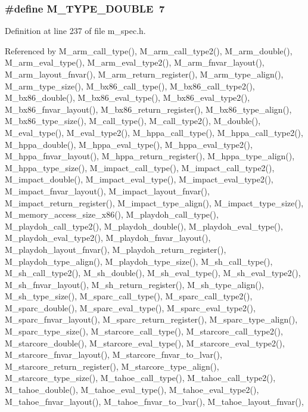 \subsubsection{\setlength{\rightskip}{0pt plus 5cm}\#define M\_\-TYPE\_\-DOUBLE~7}\label{m__spec_8h_48d49739b20483626fbb83ff298c8817}




Definition at line 237 of file m\_\-spec.h.

Referenced by M\_\-arm\_\-call\_\-type(), M\_\-arm\_\-call\_\-type2(), M\_\-arm\_\-double(), M\_\-arm\_\-eval\_\-type(), M\_\-arm\_\-eval\_\-type2(), M\_\-arm\_\-fnvar\_\-layout(), M\_\-arm\_\-layout\_\-fnvar(), M\_\-arm\_\-return\_\-register(), M\_\-arm\_\-type\_\-align(), M\_\-arm\_\-type\_\-size(), M\_\-bx86\_\-call\_\-type(), M\_\-bx86\_\-call\_\-type2(), M\_\-bx86\_\-double(), M\_\-bx86\_\-eval\_\-type(), M\_\-bx86\_\-eval\_\-type2(), M\_\-bx86\_\-fnvar\_\-layout(), M\_\-bx86\_\-return\_\-register(), M\_\-bx86\_\-type\_\-align(), M\_\-bx86\_\-type\_\-size(), M\_\-call\_\-type(), M\_\-call\_\-type2(), M\_\-double(), M\_\-eval\_\-type(), M\_\-eval\_\-type2(), M\_\-hppa\_\-call\_\-type(), M\_\-hppa\_\-call\_\-type2(), M\_\-hppa\_\-double(), M\_\-hppa\_\-eval\_\-type(), M\_\-hppa\_\-eval\_\-type2(), M\_\-hppa\_\-fnvar\_\-layout(), M\_\-hppa\_\-return\_\-register(), M\_\-hppa\_\-type\_\-align(), M\_\-hppa\_\-type\_\-size(), M\_\-impact\_\-call\_\-type(), M\_\-impact\_\-call\_\-type2(), M\_\-impact\_\-double(), M\_\-impact\_\-eval\_\-type(), M\_\-impact\_\-eval\_\-type2(), M\_\-impact\_\-fnvar\_\-layout(), M\_\-impact\_\-layout\_\-fnvar(), M\_\-impact\_\-return\_\-register(), M\_\-impact\_\-type\_\-align(), M\_\-impact\_\-type\_\-size(), M\_\-memory\_\-access\_\-size\_\-x86(), M\_\-playdoh\_\-call\_\-type(), M\_\-playdoh\_\-call\_\-type2(), M\_\-playdoh\_\-double(), M\_\-playdoh\_\-eval\_\-type(), M\_\-playdoh\_\-eval\_\-type2(), M\_\-playdoh\_\-fnvar\_\-layout(), M\_\-playdoh\_\-layout\_\-fnvar(), M\_\-playdoh\_\-return\_\-register(), M\_\-playdoh\_\-type\_\-align(), M\_\-playdoh\_\-type\_\-size(), M\_\-sh\_\-call\_\-type(), M\_\-sh\_\-call\_\-type2(), M\_\-sh\_\-double(), M\_\-sh\_\-eval\_\-type(), M\_\-sh\_\-eval\_\-type2(), M\_\-sh\_\-fnvar\_\-layout(), M\_\-sh\_\-return\_\-register(), M\_\-sh\_\-type\_\-align(), M\_\-sh\_\-type\_\-size(), M\_\-sparc\_\-call\_\-type(), M\_\-sparc\_\-call\_\-type2(), M\_\-sparc\_\-double(), M\_\-sparc\_\-eval\_\-type(), M\_\-sparc\_\-eval\_\-type2(), M\_\-sparc\_\-fnvar\_\-layout(), M\_\-sparc\_\-return\_\-register(), M\_\-sparc\_\-type\_\-align(), M\_\-sparc\_\-type\_\-size(), M\_\-starcore\_\-call\_\-type(), M\_\-starcore\_\-call\_\-type2(), M\_\-starcore\_\-double(), M\_\-starcore\_\-eval\_\-type(), M\_\-starcore\_\-eval\_\-type2(), M\_\-starcore\_\-fnvar\_\-layout(), M\_\-starcore\_\-fnvar\_\-to\_\-lvar(), M\_\-starcore\_\-return\_\-register(), M\_\-starcore\_\-type\_\-align(), M\_\-starcore\_\-type\_\-size(), M\_\-tahoe\_\-call\_\-type(), M\_\-tahoe\_\-call\_\-type2(), M\_\-tahoe\_\-double(), M\_\-tahoe\_\-eval\_\-type(), M\_\-tahoe\_\-eval\_\-type2(), M\_\-tahoe\_\-fnvar\_\-layout(), M\_\-tahoe\_\-fnvar\_\-to\_\-lvar(), M\_\-tahoe\_\-layout\_\-fnvar(), 